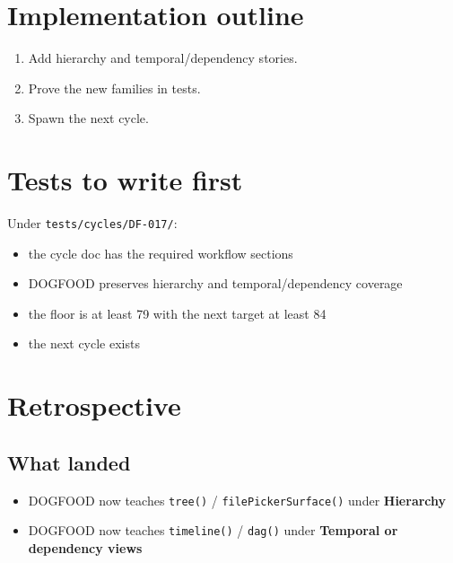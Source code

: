 \section{Implementation outline}\label{record-079-implementation-outline}

\begin{enumerate}
\def\labelenumi{\arabic{enumi}.}
\tightlist
\item
  Add hierarchy and temporal/dependency stories.
\item
  Prove the new families in tests.
\item
  Spawn the next cycle.
\end{enumerate}

\section{Tests to write first}\label{record-079-tests-to-write-first}

Under \texttt{t\allowbreak{}e\allowbreak{}s\allowbreak{}t\allowbreak{}s\allowbreak{}/\allowbreak{}c\allowbreak{}y\allowbreak{}c\allowbreak{}l\allowbreak{}e\allowbreak{}s\allowbreak{}/\allowbreak{}D\allowbreak{}F\allowbreak{}-\allowbreak{}0\allowbreak{}1\allowbreak{}7\allowbreak{}/}:

\begin{itemize}
\tightlist
\item
  the cycle doc has the required workflow sections
\item
  DOGFOOD preserves hierarchy and temporal/dependency coverage
\item
  the floor is at least 79 with the next target at least 84
\item
  the next cycle exists
\end{itemize}

\section{Retrospective}\label{record-079-retrospective}

\subsection{What landed}\label{record-079-what-landed}

\begin{itemize}
\tightlist
\item
  DOGFOOD now teaches \texttt{t\allowbreak{}r\allowbreak{}e\allowbreak{}e\allowbreak{}(\allowbreak{})} / \texttt{f\allowbreak{}i\allowbreak{}l\allowbreak{}e\allowbreak{}P\allowbreak{}i\allowbreak{}c\allowbreak{}k\allowbreak{}e\allowbreak{}r\allowbreak{}S\allowbreak{}u\allowbreak{}r\allowbreak{}f\allowbreak{}a\allowbreak{}c\allowbreak{}e\allowbreak{}(\allowbreak{})} under \textbf{Hierarchy}
\item
  DOGFOOD now teaches \texttt{t\allowbreak{}i\allowbreak{}m\allowbreak{}e\allowbreak{}l\allowbreak{}i\allowbreak{}n\allowbreak{}e\allowbreak{}(\allowbreak{})} / \texttt{d\allowbreak{}a\allowbreak{}g\allowbreak{}(\allowbreak{})} under \textbf{Temporal or dependency views}
\end{itemize}

